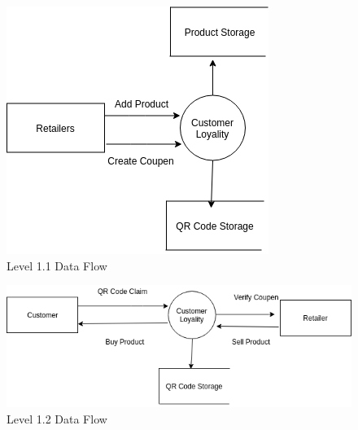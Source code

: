 \hspace{2.0mm}
\begin{figure}[H]
\includegraphics[scale=0.63]{level1_1}
\caption{Level 1.1 Data Flow}
\end{figure}
\vspace{2cm}
\begin{figure}[H]
\includegraphics[scale=0.63]{level1_2}
\caption{Level 1.2 Data Flow}
\end{figure}





